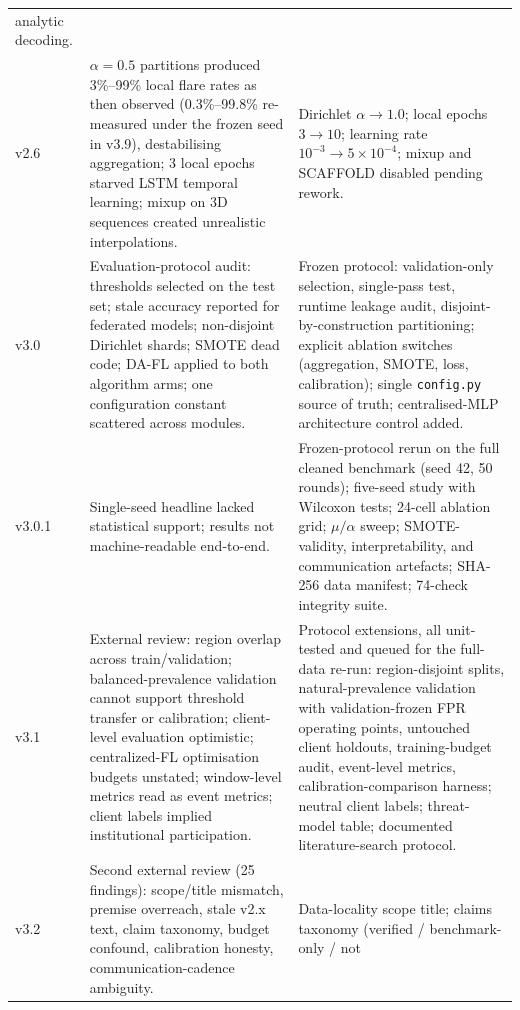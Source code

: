 \begin{longtable}{@{}p{} >{\raggedright\arraybackslash}p{} >{\raggedright\arraybackslash}p{}@{}}
analytic decoding. \\
\addlinespace[2pt]
v2.6 & $\alpha\!=\!0.5$ partitions produced 3\%--99\% local flare
rates as then observed (0.3\%--99.8\% re-measured under the frozen
seed in v3.9), destabilising aggregation; 3 local epochs starved LSTM
temporal learning; mixup on 3D sequences created unrealistic
interpolations. & Dirichlet $\alpha\!\to\!1.0$; local epochs
$3\!\to\!10$; learning rate $10^{-3}\!\to\!5\times10^{-4}$; mixup and
SCAFFOLD disabled pending rework. \\
\addlinespace[2pt]
v3.0 & Evaluation-protocol audit: thresholds selected on the test
set; stale accuracy reported for federated models; non-disjoint
Dirichlet shards; SMOTE dead code; DA-FL applied to both algorithm
arms; one configuration constant scattered across modules. & Frozen
protocol: validation-only selection, single-pass test, runtime
leakage audit, disjoint-by-construction partitioning; explicit
ablation switches (aggregation, SMOTE, loss, calibration); single
\texttt{config.py} source of truth; centralised-MLP architecture
control added. \\
\addlinespace[2pt]
v3.0.1 & Single-seed headline lacked statistical support; results
not machine-readable end-to-end. & Frozen-protocol rerun on the full
cleaned benchmark (seed 42, 50 rounds); five-seed study with Wilcoxon
tests; 24-cell ablation grid; $\mu/\alpha$ sweep; SMOTE-validity,
interpretability, and communication artefacts; SHA-256 data manifest;
74-check integrity suite. \\
\addlinespace[2pt]
v3.1 & External review: region overlap across train/validation;
balanced-prevalence validation cannot support threshold transfer or
calibration; client-level evaluation optimistic; centralized-FL
optimisation budgets unstated; window-level metrics read as event
metrics; client labels implied institutional participation. &
Protocol extensions, all unit-tested and queued for the
full-data re-run: region-disjoint splits, natural-prevalence
validation with validation-frozen FPR operating points, untouched
client holdouts, training-budget audit, event-level metrics,
calibration-comparison harness; neutral client labels; threat-model
table; documented literature-search protocol. \\
\addlinespace[2pt]
v3.2 & Second external review (25 findings): scope/title mismatch,
premise overreach, stale v2.x text, claim taxonomy, budget confound,
calibration honesty, communication-cadence ambiguity. & Data-locality
scope title; claims taxonomy (verified / benchmark-only / not

\end{longtable}
